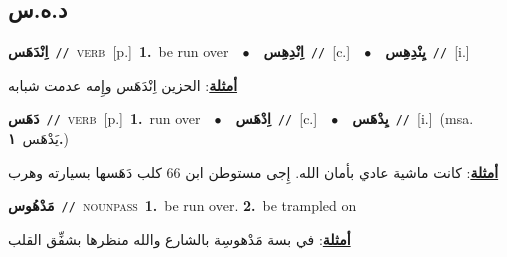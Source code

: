 \documentclass[10pt,a4paper,twoside]{article} %
\begin{document}
\begin{multicols}{2}
\vspace{-3mm}
\subsection*{\color{blue}\foreignlanguage{arabic}{د.ه.س}\color{blue}{}} 

{\setlength\topsep{0pt}\textbf{\foreignlanguage{arabic}{اِنْدَهَس}}\ {\color{gray}\texttt{//}\color{black}}\ \textsc{verb}\ [p.]\ \textbf{1.}~be run over\ \ $\bullet$\ \ \setlength\topsep{0pt}\textbf{\foreignlanguage{arabic}{اِنْدِهِس}}\ {\color{gray}\texttt{//}\color{black}}\ [c.]\ \ $\bullet$\ \ \setlength\topsep{0pt}\textbf{\foreignlanguage{arabic}{يِنْدِهِس}}\ {\color{gray}\texttt{//}\color{black}}\ [i.]\  \begin{flushright}\color{gray}\foreignlanguage{arabic}{\textbf{\underline{\foreignlanguage{arabic}{أمثلة}}}: الحزين اِنْدَهَس وإِمه عدمت شبابه}\end{flushright}\color{black}} \vspace{2mm}

{\setlength\topsep{0pt}\textbf{\foreignlanguage{arabic}{دَهَس}}\ {\color{gray}\texttt{//}\color{black}}\ \textsc{verb}\ [p.]\ \textbf{1.}~run over\ \ $\bullet$\ \ \setlength\topsep{0pt}\textbf{\foreignlanguage{arabic}{اِدْهَس}}\ {\color{gray}\texttt{//}\color{black}}\ [c.]\ \ $\bullet$\ \ \setlength\topsep{0pt}\textbf{\foreignlanguage{arabic}{يِدْهَس}}\ {\color{gray}\texttt{//}\color{black}}\ [i.]\ \color{gray}(msa. \foreignlanguage{arabic}{يَدْهَس}~\foreignlanguage{arabic}{\textbf{١.}})\color{black}\  \begin{flushright}\color{gray}\foreignlanguage{arabic}{\textbf{\underline{\foreignlanguage{arabic}{أمثلة}}}: كانت ماشية عادي بأمان الله. إِجى مستوطن ابن 66 كلب دَهَسها بسيارته وهرب}\end{flushright}\color{black}} \vspace{2mm}

{\setlength\topsep{0pt}\textbf{\foreignlanguage{arabic}{مَدْهُوس}}\ {\color{gray}\texttt{//}\color{black}}\ \textsc{noun\textunderscore pass}\ \textbf{1.}~be run over.  \textbf{2.}~be trampled on\  \begin{flushright}\color{gray}\foreignlanguage{arabic}{\textbf{\underline{\foreignlanguage{arabic}{أمثلة}}}: في بسة مَدْهوسِة بالشارع والله منظرها بشفِّق القلب}\end{flushright}\color{black}} \vspace{2mm}


\end{multicols}
\end{document}
